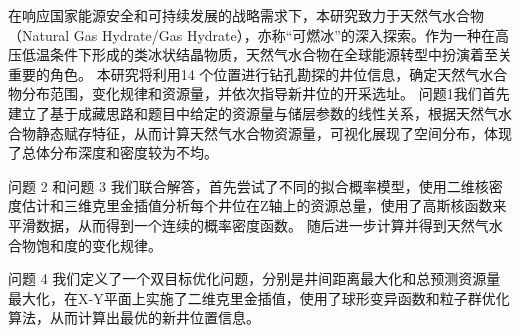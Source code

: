 

{\song\xiaosihao
\setlength{\parindent}{2em}
在响应国家能源安全和可持续发展的战略需求下，本研究致力于天然气水合物（Natural Gas Hydrate/Gas Hydrate），亦称“可燃冰”的深入探索。作为一种在高压低温条件下形成的类冰状结晶物质，天然气水合物在全球能源转型中扮演着至关重要的角色。
本研究将利用14 个位置进行钻孔勘探的井位信息，确定天然气水合物分布范围，变化规律和资源量，并依次指导新井位的开采选址。
\setlength{\parindent}{2em}问题1我们首先建立了基于成藏思路和题目中给定的资源量与储层参数的线性关系，根据天然气水合物静态赋存特征，从而计算天然气水合物资源量，可视化展现了空间分布，体现了总体分布深度和密度较为不均。

\setlength{\parindent}{2em}
问题 2 和问题 3 我们联合解答，首先尝试了不同的拟合概率模型，使用二维核密度估计和三维克里金插值分析每个井位在Z轴上的资源总量，使用了高斯核函数来平滑数据，从而得到一个连续的概率密度函数。
随后进一步计算并得到天然气水合物饱和度的变化规律。

\setlength{\parindent}{2em}问题 4 我们定义了一个双目标优化问题，分别是井间距离最大化和总预测资源量最大化，在X-Y平面上实施了二维克里金插值，使用了球形变异函数和粒子群优化算法，从而计算出最优的新井位置信息。
}
\begin{rmk}

\end{rmk}






